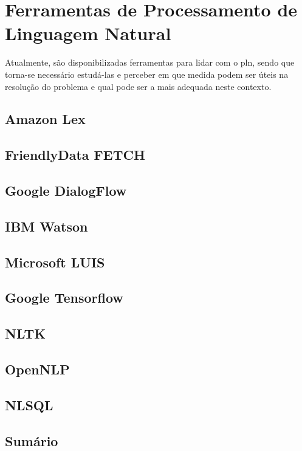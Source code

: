 \section{Ferramentas de Processamento de Linguagem Natural}
\label{sec:chap03_existingtools}
Atualmente, são disponibilizadas ferramentas para lidar com o \gls{pln}, sendo que torna-se necessário estudá-las e perceber em que medida podem ser úteis na resolução do problema e qual pode ser a mais adequada neste contexto.

\subsection{Amazon Lex}
\tbd

\subsection{FriendlyData FETCH}
\tbd

\subsection{Google DialogFlow}
\tbd

\subsection{IBM Watson}
\tbd

\subsection{Microsoft LUIS}
\tbd

\subsection{Google Tensorflow}
\tbd

\subsection{NLTK}
\tbd

\subsection{OpenNLP}
\tbd

\subsection{NLSQL}
\tbd

\subsection{Sumário}
\tbd